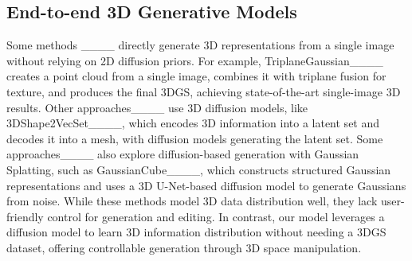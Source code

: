 \subsection{End-to-end 3D Generative Models}
\label{sec:related_3d}
Some methods ____ directly generate 3D representations from a single image without relying on 2D diffusion priors. For example, TriplaneGaussian____ creates a point cloud from a single image, combines it with triplane fusion for texture, and produces the final 3DGS, achieving state-of-the-art single-image 3D results. Other approaches____ use 3D diffusion models, like 3DShape2VecSet____, which encodes 3D information into a latent set and decodes it into a mesh, with diffusion models generating the latent set. Some approaches____ also explore diffusion-based generation with Gaussian Splatting, such as GaussianCube____, which constructs structured Gaussian representations and uses a 3D U-Net-based diffusion model to generate Gaussians from noise. While these methods model 3D data distribution well, they lack user-friendly control for generation and editing. In contrast, our model leverages a diffusion model to learn 3D information distribution without needing a 3DGS dataset, offering controllable generation through 3D space manipulation.

